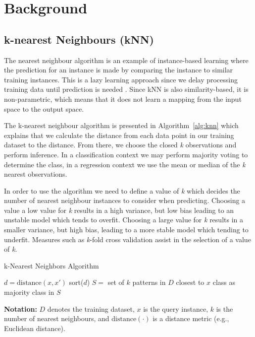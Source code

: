\documentclass[10pt, conference]{IEEEtran}
\begin{document}
\section{Background}

\subsection{k-nearest Neighbours (kNN)}
The nearest neighbour algorithm is an example of instance-based learning where the prediction for an instance is made by comparing the instance to similar training instances. This is a lazy learning approach since we delay processing training data until prediction is needed \cite{kelleher2020fundamentals}. Since kNN is also similarity-based, it is non-parametric, which means that it does not learn a mapping from the input space to the output space.

The k-nearest neighbour algorithm is presented in Algorithm~\ref{alg:knn} which explains that we calculate the distance from each data point in our training dataset to the distance. From there, we choose the closed \textit{k} observations and perform inference. In a classification context we may perform majority voting to determine the class, in a regression context we use the mean or median of the \textit{k} nearest observations.

In order to use the algorithm we need to define a value of \textit{k} which decides the number of nearest neighbour instances to consider when predicting. Choosing a value a low value for \textit{k} results in a high variance, but low bias leading to an unstable model which tends to overfit. Choosing a large value for \textit{k} results in a smaller variance, but high bias, leading to a more stable model which tending to underfit. Measures such as \textit{k}-fold cross validation assist in the selection of a value of \textit{k}.

\begin{algorithm}[htbp]
\caption{k-Nearest Neighbors Algorithm}
\label{alg:knn}
\begin{algorithmic}
\State $d = \text{distance}(x, x')$
\EndFor
\State sort($d$)
\State $S = $ set of $k$ patterns in $D$ closest to $x$
\State \Return class as majority class in $S$
\EndFunction
\end{algorithmic}
\end{algorithm}
\noindent
\textbf{Notation:} $D$ denotes the training dataset, $x$ is the query instance, $k$ is the number of nearest neighbours, and $\text{distance}(\cdot)$ is a distance metric (e.g., Euclidean distance).
\end{document}

